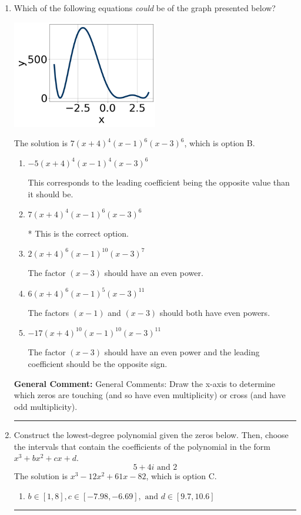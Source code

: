 \documentclass{extbook}[14pt]
\newcommand{\litem}[1]{\item #1

\rule{\textwidth}{0.4pt}}
\begin{document}
\begin{enumerate}\litem{
Which of the following equations \textit{could} be of the graph presented below?

\begin{center}
    \includegraphics[width=0.5\textwidth]{../Figures/polyGraphToFunctionA.png}
\end{center}



The solution is \( 7(x + 4)^{4} (x - 1)^{6} (x - 3)^{6} \), which is option B.\begin{enumerate}[label=\Alph*.]
\item \( -5(x + 4)^{4} (x - 1)^{4} (x - 3)^{6} \)

This corresponds to the leading coefficient being the opposite value than it should be.
\item \( 7(x + 4)^{4} (x - 1)^{6} (x - 3)^{6} \)

* This is the correct option.
\item \( 2(x + 4)^{6} (x - 1)^{10} (x - 3)^{7} \)

The factor $(x - 3)$ should have an even power.
\item \( 6(x + 4)^{6} (x - 1)^{5} (x - 3)^{11} \)

The factors $(x - 1)$ and $(x - 3)$ should both have even powers.
\item \( -17(x + 4)^{10} (x - 1)^{10} (x - 3)^{11} \)

The factor $(x - 3)$ should have an even power and the leading coefficient should be the opposite sign.
\end{enumerate}

\textbf{General Comment:} General Comments: Draw the x-axis to determine which zeros are touching (and so have even multiplicity) or cross (and have odd multiplicity).
}
\litem{
Construct the lowest-degree polynomial given the zeros below. Then, choose the intervals that contain the coefficients of the polynomial in the form $x^3+bx^2+cx+d$.
\[ 5 + 4 i \text{ and } 2 \]
The solution is \( x^{3} -12 x^{2} +61 x -82 \), which is option C.\begin{enumerate}[label=\Alph*.]
\item \( b \in [1, 8], c \in [-7.98, -6.69], \text{ and } d \in [9.7, 10.6] \)


\end{enumerate}}
\end{enumerate}
\end{document}
